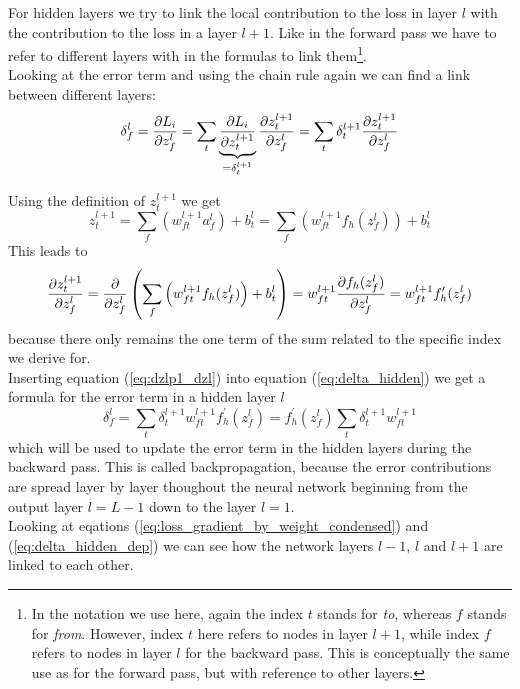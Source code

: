For hidden layers we try to link the local contribution to the loss in layer $l$ with the
contribution to the loss in a layer $l+1$. Like in the forward pass we have to refer to
different layers with in the formulas to link them\footnote{In the notation we use here,
again the index $t$ stands for \emph{to}, whereas $f$ stands for \emph{from}. However,
index $t$ here refers to nodes in layer $l+1$, while index $f$ refers to nodes in layer
$l$ for the backward pass. This is conceptually the same use as for the forward pass, but
with reference to other layers.}. \\

Looking at the error term and using the chain rule again we can find a link between
different layers:
\begin{equation}
    \delta_f^l = \frac{\partial {L_i}}{\partial {z_f^l}}
    = \sum\limits_t \underbrace{\frac{\partial {L_i}}{\partial {z_t^{l+1}}}}_{= \delta_t^{l+1}} \frac{\partial {z_t^{l+1}}}{\partial {z_f^l}} 
    = \sum\limits_t \delta_t^{l+1} \frac{\partial {z_t^{l+1}}}{\partial {z_f^l}}
    \label{eq:delta_hidden}
\end{equation} 

Using the definition of $z_t^{l+1}$ we get
\begin{equation}
    z_t^{l+1} = \sum\limits_f \left( w_{ft}^{l+1} a_f^l \right) + b_t^l
    = \sum\limits_f \left( w_{ft}^{l+1} f_h( z_f^l ) \right) + b_t^l
\end{equation}
This leads to
\begin{equation}
    \frac{\partial {z_t^{l+1}}}{\partial {z_f^l}}
    = \frac{\partial {}}{\partial {z_f^l}} \left( \sum\limits_f \left( w_{ft}^{l+1} f_h( z_f^l ) \right) + b_t^l \right)
    = w_{ft}^{l+1} \frac{\partial {f_h( z_f^l )}}{\partial {z_f^l}}
    = w_{ft}^{l+1} f_h^\prime( z_f^l )
    \label{eq:dzlp1_dzl}
\end{equation}
because there only remains the one term of the sum related to the specific index we derive
for. \\

Inserting equation (\ref{eq:dzlp1_dzl}) into equation (\ref{eq:delta_hidden}) we get a
formula for the error term in a hidden layer $l$
\begin{equation}
    \delta_f^l = \sum\limits_t \delta_t^{l+1} w_{ft}^{l+1} f_h^\prime( z_f^l )
    = f_h^\prime( z_f^l ) \sum\limits_t \delta_t^{l+1} w_{ft}^{l+1}
    \label{eq:delta_hidden_dep}
\end{equation}
which will be used to update the error term in the hidden layers during the backward pass.
This is called backpropagation, because the error contributions are spread layer by layer
thoughout the neural network beginning from the output layer $l=L-1$ down to the layer
$l=1$. \\

Looking at eqations (\ref{eq:loss_gradient_by_weight_condensed}) and
(\ref{eq:delta_hidden_dep}) we can see how the network layers $l-1$, $l$ and $l+1$ are
linked to each other.

\newpage